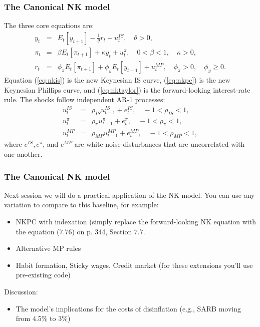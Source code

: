 \documentclass[10pt, xcolor=x11names, table]{beamer}
\begin{document}
\begin{frame}\frametitle{The Canonical NK model}
The three core equations are:
\begin{eqnarray} \label{eq:nkis}
y_t &=& E_t\left[y_{t+1}\right]-\frac{1}{\theta} r_t+u_t^{IS}, \quad \theta>0, \\ \label{eq:nkpc}
\pi_t &=& \beta E_t\left[\pi_{t+1}\right]+\kappa y_t+u_t^\pi, \quad 0<\beta<1, \quad \kappa>0, \\ \label{eq:nktaylor}
r_t &=& \phi_\pi E_t\left[\pi_{t+1}\right]+\phi_y E_t\left[y_{t+1}\right]+u_t^{MP}, \quad \phi_\pi>0, \quad \phi_y \geq 0 .
\end{eqnarray}
Equation (\ref{eq:nkis}) is the new Keynesian IS curve, (\ref{eq:nkpc}) is the new Keynesian Phillips curve, and (\ref{eq:nktaylor}) is the forward-looking interest-rate rule. The shocks follow independent AR-1 processes:
\begin{eqnarray}
u_t^{IS} &=& \rho_{IS} u_{t-1}^{IS}+e_t^{IS}, \quad -1<\rho_{I S}<1, \\
u_t^\pi &=& \rho_\pi u_{t-1}^\pi+e_t^\pi, \quad -1<\rho_\pi<1, \\
u_t^{MP} &=& \rho_{MP} u_{t-1}^{MP}+e_t^{MP}, \quad -1<\rho_{M P}<1,
\end{eqnarray}
where $e^{IS}, e^\pi$, and $e^{MP}$ are white-noise disturbances that are uncorrelated with one another.
\end{frame}


\begin{frame}\frametitle{The Canonical NK model}

Next session we will do a practical application of the NK model. You can use any variation to compare to this baseline, for example:
\begin{itemize}
\item NKPC with indexation (simply replace the forward-looking NK equation with the equation (7.76) on p. 344, Section 7.7.
\item Alternative MP rules
\item Habit formation, Sticky wages, Credit market (for these extensions you'll use pre-existing code)
\end{itemize}
Discussion:
\begin{itemize}
\item The model's implications for the costs of disinflation (e.g., SARB moving from 4.5\% to 3\%)
\end{itemize}

\end{frame}
\end{document}
